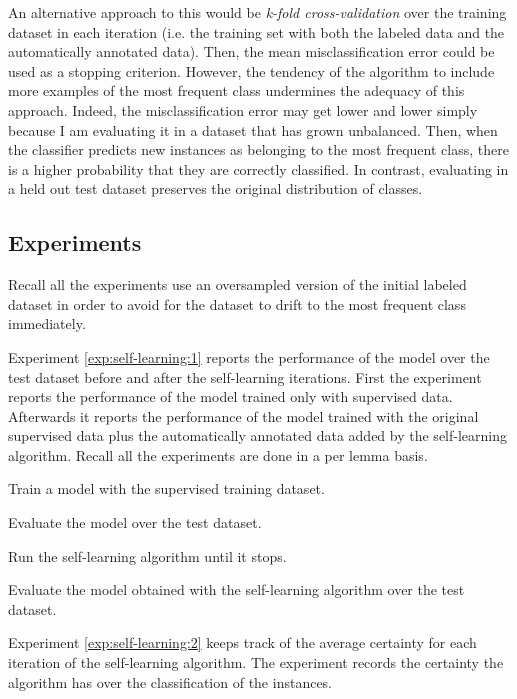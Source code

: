 An alternative approach to this would be {\em k-fold cross-validation} over the
training dataset in each iteration (i.e. the training set with both the labeled
data and the automatically annotated data). Then, the mean misclassification
error could be used as a stopping criterion. However, the tendency of the
algorithm to include more examples of the most frequent class undermines the
adequacy of this approach. Indeed, the misclassification error may get lower
and lower simply because I am evaluating it in a dataset that has grown
unbalanced. Then, when the classifier predicts new instances as belonging to
the most frequent class, there is a higher probability that they are correctly
classified. In contrast, evaluating in a held out test dataset preserves the
original distribution of classes.

\subsection{Experiments}\label{sec:self-learning:experiments}

Recall all the experiments use an oversampled version of the initial labeled
dataset in order to avoid for the dataset to drift to the most frequent class
immediately.

Experiment \ref{exp:self-learning:1} reports the performance of the model over
the test dataset before and after the self-learning iterations. First the
experiment reports the performance of the model trained only with supervised
data. Afterwards it reports the performance of the model trained with the
original supervised data plus the automatically annotated data added by the
self-learning algorithm. Recall all the experiments are done in a per lemma
basis. 

\begin{experiment}\label{exp:self-learning:1}
  \begin{enumexp}
    \item Train a model with the supervised training dataset.
    \item Evaluate the model over the test dataset.
    \item Run the self-learning algorithm until it stops.
    \item Evaluate the model obtained with the self-learning algorithm over the
      test dataset.
  \end{enumexp}
\end{experiment}

Experiment \ref{exp:self-learning:2} keeps track of the average certainty for
each iteration of the self-learning algorithm. The experiment records the
certainty the algorithm has over the classification of the instances.

